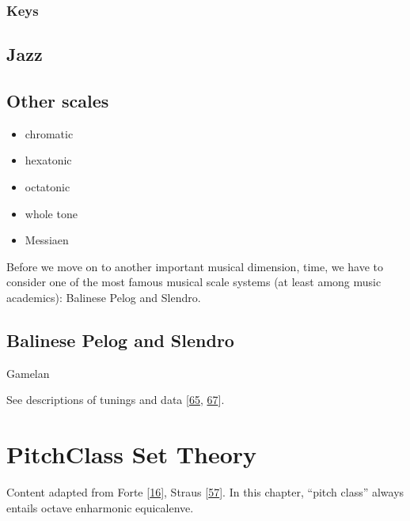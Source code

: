 \documentclass[letterpaper,10pt,english]{sphinxmanual}
\begin{document}
\subsection{Keys}
\label{\detokenize{2_scales_modes:keys}}

\section{Jazz}
\label{\detokenize{2_scales_modes:jazz}}

\section{Other scales}
\label{\detokenize{2_scales_modes:other-scales}}\begin{itemize}
\item {} 
\sphinxAtStartPar
chromatic

\item {} 
\sphinxAtStartPar
hexatonic

\item {} 
\sphinxAtStartPar
octatonic

\item {} 
\sphinxAtStartPar
whole tone

\item {} 
\sphinxAtStartPar
Messiaen

\end{itemize}

\sphinxAtStartPar
Before we move on to another important musical dimension, time, we have to consider
one of the most famous musical scale systems (at least among music academics): Balinese Pelog and Slendro.


\section{Balinese Pelog and Slendro}
\label{\detokenize{2_scales_modes:balinese-pelog-and-slendro}}
\sphinxAtStartPar
Gamelan

\sphinxAtStartPar
See descriptions of tunings 
and data 
{[}\hyperlink{cite.8_bibliography:id33}{65}, \hyperlink{cite.8_bibliography:id34}{67}{]}.


\chapter{Pitch\sphinxhyphen{}Class Set Theory}
\label{\detokenize{3_set_theory:pitch-class-set-theory}}\label{\detokenize{3_set_theory::doc}}
\sphinxAtStartPar
Content adapted from Forte {[}\hyperlink{cite.8_bibliography:id25}{16}{]}, Straus {[}\hyperlink{cite.8_bibliography:id3}{57}{]}.
In this chapter, “pitch class” always entails octave  enharmonic equicalenve.
\end{document}
